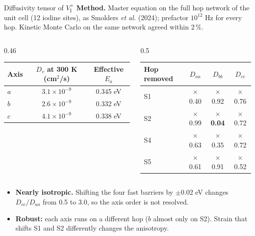 \documentclass[aspectratio=169,10pt]{beamer}
\begin{document}
\begin{frame}{Diffusivity tensor of $V_\mathrm{I}^{+}$}
  \small
  \textbf{Method.} Master equation on the full hop network of the unit cell (12 iodine sites), as Smolders \emph{et al.} (2024); prefactor $10^{12}$ Hz for every hop. Kinetic Monte Carlo on the same network agreed within 2\,\%.

  \vspace{0.3em}
  \begin{columns}[T]
    \begin{column}{0.46\textwidth}
      \centering\scriptsize
      \begin{tabular}{lcc}
        \toprule
        Axis & $D_v$ at 300 K (cm$^2$/s) & Effective $E_a$ \\
        \midrule
        $a$ & $3.1\times10^{-9}$ & 0.345 eV \\
        $b$ & $2.6\times10^{-9}$ & 0.332 eV \\
        $c$ & $4.1\times10^{-9}$ & 0.338 eV \\
        \bottomrule
      \end{tabular}
    \end{column}
    \begin{column}{0.5\textwidth}
      \centering\scriptsize
      \begin{tabular}{lccc}
        \toprule
        Hop removed & $D_{aa}$ & $D_{bb}$ & $D_{cc}$ \\
        \midrule
        S1 & $\times$0.40 & $\times$0.92 & $\times$0.76 \\
        S2 & $\times$0.99 & $\times$\textbf{0.04} & $\times$0.72 \\
        S4 & $\times$0.63 & $\times$0.35 & $\times$0.72 \\
        S5 & $\times$0.61 & $\times$0.91 & $\times$0.52 \\
        \bottomrule
      \end{tabular}
    \end{column}
  \end{columns}

  \vspace{0.4em}
  \begin{itemize}
    \item \textbf{Nearly isotropic.} Shifting the four fast barriers by $\pm$0.02 eV changes $D_{cc}/D_{aa}$ from 0.5 to 3.0, so the axis order is not resolved.
    \item \textbf{Robust:} each axis runs on a different hop ($b$ almost only on S2). Strain that shifts S1 and S2 differently changes the anisotropy.
  \end{itemize}
\end{frame}
\end{document}
